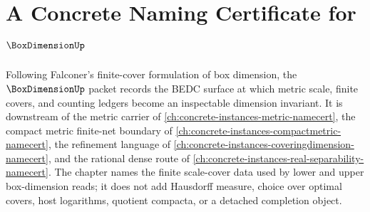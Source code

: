 \chapter{A Concrete Naming Certificate for $\BoxDimensionUp$}
\label{ch:concrete-instances-box-dimension-namecert}

Following Falconer's finite-cover formulation of box dimension, the $\BoxDimensionUp$ packet records the BEDC surface at which metric scale, finite covers, and counting ledgers become an inspectable dimension invariant. It is downstream of the metric carrier of \autoref{ch:concrete-instances-metric-namecert}, the compact metric finite-net boundary of \autoref{ch:concrete-instances-compactmetric-namecert}, the refinement language of \autoref{ch:concrete-instances-coveringdimension-namecert}, and the rational dense route of \autoref{ch:concrete-instances-real-separability-namecert}. The chapter names the finite scale-cover data used by lower and upper box-dimension reads; it does not add Hausdorff measure, choice over optimal covers, host logarithms, quotient compacta, or a detached completion object.

